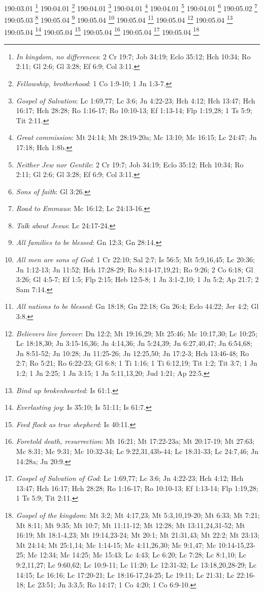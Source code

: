 190:03.01 \footnote{\textit{In kingdom, no differences}: 2 Cr 19:7; Job 34:19; Eclo 35:12; Hch 10:34; Ro 2:11; Gl 2:6; Gl 3:28; Ef 6:9; Col 3:11.}
190:04.01 \footnote{\textit{Fellowship, brotherhood}: 1 Co 1:9-10; 1 Jn 1:3-7.}
190:04.01 \footnote{\textit{Gospel of Salvation}: Lc 1:69,77; Lc 3:6; Jn 4:22-23; Hch 4:12; Hch 13:47; Hch 16:17; Hch 28:28; Ro 1:16-17; Ro 10:10-13; Ef 1:13-14; Flp 1:19,28; 1 Ts 5:9; Tit 2:11.}
190:04.01 \footnote{\textit{Great commission}: Mt 24:14; Mt 28:19-20a; Mc 13:10; Mc 16:15; Lc 24:47; Jn 17:18; Hch 1:8b.}
190:04.01 \footnote{\textit{Neither Jew nor Gentile}: 2 Cr 19:7; Job 34:19; Eclo 35:12; Hch 10:34; Ro 2:11; Gl 2:6; Gl 3:28; Ef 6:9; Col 3:11.}
190:04.01 \footnote{\textit{Sons of faith}: Gl 3:26.}
190:05.02 \footnote{\textit{Road to Emmaus}: Mc 16:12; Lc 24:13-16.}
190:05.03 \footnote{\textit{Talk about Jesus}: Lc 24:17-24.}
190:05.04 \footnote{\textit{All families to be blessed}: Gn 12:3; Gn 28:14.}
190:05.04 \footnote{\textit{All men are sons of God}: 1 Cr 22:10; Sal 2:7; Is 56:5; Mt 5:9,16,45; Lc 20:36; Jn 1:12-13; Jn 11:52; Hch 17:28-29; Ro 8:14-17,19,21; Ro 9:26; 2 Co 6:18; Gl 3:26; Gl 4:5-7; Ef 1:5; Flp 2:15; Heb 12:5-8; 1 Jn 3:1-2,10; 1 Jn 5:2; Ap 21:7; 2 Sam 7:14.}
190:05.04 \footnote{\textit{All nations to be blessed}: Gn 18:18; Gn 22:18; Gn 26:4; Eclo 44:22; Jer 4:2; Gl 3:8.}
190:05.04 \footnote{\textit{Believers live forever}: Dn 12:2; Mt 19:16,29; Mt 25:46; Mc 10:17,30; Lc 10:25; Lc 18:18,30; Jn 3:15-16,36; Jn 4:14,36; Jn 5:24,39; Jn 6:27,40,47; Jn 6:54,68; Jn 8:51-52; Jn 10:28; Jn 11:25-26; Jn 12:25,50; Jn 17:2-3; Hch 13:46-48; Ro 2:7; Ro 5:21; Ro 6:22-23; Gl 6:8; 1 Ti 1:16; 1 Ti 6:12,19; Tit 1:2; Tit 3:7; 1 Jn 1:2; 1 Jn 2:25; 1 Jn 3:15; 1 Jn 5:11,13,20; Jud 1:21; Ap 22:5.}
190:05.04 \footnote{\textit{Bind up brokenhearted}: Is 61:1.}
190:05.04 \footnote{\textit{Everlasting joy}: Is 35:10; Is 51:11; Is 61:7.}
190:05.04 \footnote{\textit{Feed flock as true shepherd}: Is 40:11.}
190:05.04 \footnote{\textit{Foretold death, resurrection}: Mt 16:21; Mt 17:22-23a; Mt 20:17-19; Mt 27:63; Mc 8:31; Mc 9:31; Mc 10:32-34; Lc 9:22,31,43b-44; Lc 18:31-33; Lc 24:7,46; Jn 14:28a; Jn 20:9.}
190:05.04 \footnote{\textit{Gospel of Salvation of God}: Lc 1:69,77; Lc 3:6; Jn 4:22-23; Hch 4:12; Hch 13:47; Hch 16:17; Hch 28:28; Ro 1:16-17; Ro 10:10-13; Ef 1:13-14; Flp 1:19,28; 1 Ts 5:9; Tit 2:11.}
190:05.04 \footnote{\textit{Gospel of the kingdom}: Mt 3:2; Mt 4:17,23; Mt 5:3,10,19-20; Mt 6:33; Mt 7:21; Mt 8:11; Mt 9:35; Mt 10:7; Mt 11:11-12; Mt 12:28; Mt 13:11,24,31-52; Mt 16:19; Mt 18:1-4,23; Mt 19:14,23-24; Mt 20:1; Mt 21:31,43; Mt 22:2; Mt 23:13; Mt 24:14; Mt 25:1,14; Mc 1:14-15; Mc 4:11,26,30; Mc 9:1,47; Mc 10:14-15,23-25; Mc 12:34; Mc 14:25; Mc 15:43; Lc 4:43; Lc 6:20; Lc 7:28; Lc 8:1,10; Lc 9:2,11,27; Lc 9:60,62; Lc 10:9-11; Lc 11:20; Lc 12:31-32; Lc 13:18,20,28-29; Lc 14:15; Lc 16:16; Lc 17:20-21; Lc 18:16-17,24-25; Lc 19:11; Lc 21:31; Lc 22:16-18; Lc 23:51; Jn 3:3,5; Ro 14:17; 1 Co 4:20; 1 Co 6:9-10.}
